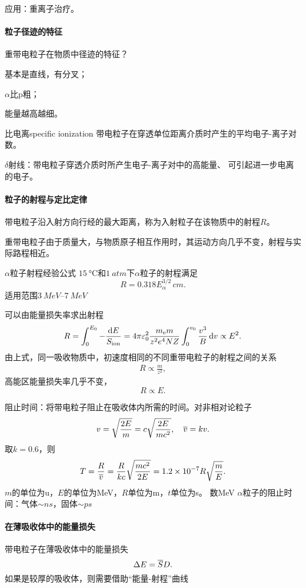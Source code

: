 应用：重离子治疗。
\paragraph{粒子径迹的特征}重带电粒子在物质中径迹的特征？
\begin{compactenum}
	\item 基本是直线，有分叉；
	\item $\alpha$比p粗；
	\item 能量越高越细。
\end{compactenum}
\begin{definition}{比电离}{specific ionization}
	带电粒子在穿透单位距离介质时产生的平均电子-离子对数。
\end{definition}
$\delta$射线：带电粒子穿透介质时所产生电子-离子对中的高能量、 可引起进一步电离的电子。
\paragraph{粒子的射程与定比定律}带电粒子沿入射方向行经的最大距离，称为入射粒子在该物质中的射程$R$。

重带电粒子由于质量大，与物质原子相互作用时，其运动方向几乎不变，射程与实际路程相近。

\begin{example}{$\alpha$粒子射程经验公式}{}
	$\SI{15}{\celsius}$和$\SI{1}{atm}$下$\alpha$粒子的射程满足
	\[
		R=0.318E_\alpha^{3/2}\,\si{cm}.
	\]
	适用范围$\SIrange{3}{7}{MeV}$
\end{example}
可以由能量损失率求出射程
\begin{align}
	R=\int_0^{E_0}-\frac{\mathop{}\!\mathrm{d} E}{S_{\mathrm{ion}}}=4\pi\varepsilon_0^2\frac{m_\mathrm e m}{z^2e^4NZ}\int_0^{v_0}\frac{v^3}B\mathop{}\!\mathrm{d} v\propto E^2.
\end{align}
由上式，同一吸收物质中，初速度相同的不同重带电粒子的射程之间的关系
\begin{align}
	R\propto\frac{m}{z^2},%
\end{align}
高能区能量损失率几乎不变，
\[
	R\propto E.
\]



阻止时间：将带电粒子阻止在吸收体内所需的时间。对非相对论粒子
\[
	v=\sqrt{\frac{2E}{m}}=c\sqrt{\frac{2E}{mc^2}},\quad\overline v=kv.
\]
取$k=0.6$，则
\[
	T=\frac{R}{\overline v}=\frac{R}{kc}\sqrt{\frac{mc^2}{2E}}=\num{1.2e-7}R\sqrt{\frac{m}E}.
\]
$m$的单位为u，$E$的单位为MeV，$R$单位为m，$t$单位为s。
数MeV $\alpha$粒子的阻止时间：气体$\sim\si{ns}$，固体$\sim\si{ps}$
\paragraph{在薄吸收体中的能量损失}
带电粒子在薄吸收体中的能量损失
\[
	\Delta E=\overline SD.
\]
如果是较厚的吸收体，则需要借助“能量-射程”曲线
